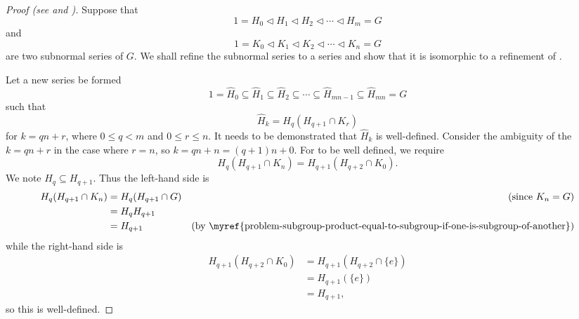 \begin{proof}[Proof (see {\cite[\S 72]{clark_1984}} and \cite{proofwiki_schreierzassenhaus})]
    Suppose that
    \begin{equation}\label{eqn:thrm-schreier-eqn-a}
        1 = H_0 \lhd H_1 \lhd H_2 \lhd \cdots \lhd H_m = G    
        \tag{A}
    \end{equation}
    and
    \begin{equation}\label{eqn:thrm-schreier-eqn-b}
        1 = K_0 \lhd K_1 \lhd K_2 \lhd \cdots \lhd K_n = G    
        \tag{B}
    \end{equation}
    are two subnormal series of $G$. We shall refine the subnormal series  to a series  and show that it is isomorphic to a refinement  of .
    
    Let a new series be formed
    \begin{equation}\label{eqn:thrm-schreier-eqn-a-prime}
        1 = \hat{H}_0 \subseteq \hat{H}_1 \subseteq \hat{H}_2 \subseteq \cdots \subseteq \hat{H}_{mn - 1} \subseteq \hat{H}_{mn} = G
        \tag{A'}
    \end{equation}
    such that
    \[
        \hat{H}_k = H_q(H_{q+1}\cap K_r)
    \]
    for $k = qn + r$, where $0 \leq q < m$ and $0 \leq r \leq n$. It needs to be demonstrated that $\hat{H}_k$ is well-defined. Consider the ambiguity of the $k = qn + r$ in the case where $r = n$, so $k = qn + n = (q+1)n + 0$. For  to be well defined, we require
    \[
        H_q(H_{q+1} \cap K_n) = H_{q+1}(H_{q+2} \cap K_0).
    \]
    We note $H_q \subseteq H_{q+1}$. Thus the left-hand side is
    \begin{align*}
        H_q(H_{q+1} \cap K_n) &= H_q(H_{q+1} \cap G) & (\text{since } K_n = G)\\
        &= H_qH_{q+1}\\
        &= H_{q+1} & (\text{by \myref{problem-subgroup-product-equal-to-subgroup-if-one-is-subgroup-of-another}})
    \end{align*}
    while the right-hand side is
    \begin{align*}
        H_{q+1}(H_{q+2} \cap K_0) &= H_{q+1}(H_{q+2} \cap \{e\})\\
        &= H_{q+1}(\{e\})\\
        &= H_{q+1},
    \end{align*}
    so this is well-defined.
    

\end{proof}
